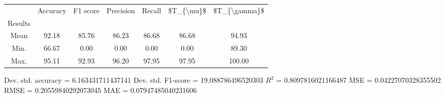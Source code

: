 \begin{tabular}{|c|c|c|c|c|c|c|}
\toprule
{} &  Accuracy &  F1 score &  Precision &  Recall &  \$T\_\{\textbackslash mu\}\$ &  \$T\_\{\textbackslash gamma\}\$ \\
Results &           &           &            &         &            &               \\
\hline
Mean    &     92.18 &     85.76 &      86.23 &   86.68 &      86.68 &         94.93 \\
Min.    &     66.67 &      0.00 &       0.00 &    0.00 &       0.00 &         89.30 \\
Max.    &     95.11 &     92.93 &      96.20 &   97.95 &      97.95 &        100.00 \\
\bottomrule
\end{tabular}

 Dev. std. accuracy = 6.163431711437141
 Dev. std. F1-score = 19.088786496520303
 $R^2$ = 0.8097816021166487
 MSE = 0.04227070328355502
 RMSE = 0.20559840292073045
 MAE = 0.07947485040231606